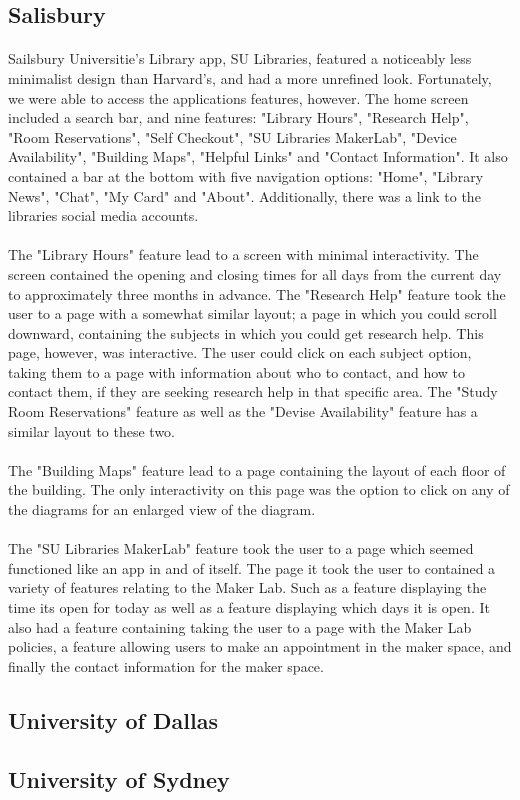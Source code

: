 \subsection{Salisbury}
\paragraph{}
Sailsbury Universitie's Library app, SU Libraries, featured a noticeably less minimalist design than Harvard's, and had a more unrefined look.  Fortunately, we were able to access the applications features, however. The home screen included a search bar, and nine features: "Library Hours", "Research Help", "Room Reservations", "Self Checkout", "SU Libraries MakerLab", "Device Availability", "Building Maps", "Helpful Links" and "Contact Information". It also contained a bar at the bottom with five navigation options: "Home", "Library News", "Chat", "My Card" and "About". Additionally, there was a link to the libraries social media accounts.
\paragraph{}
The "Library Hours" feature lead to a screen with minimal interactivity. The screen contained the opening and closing times for all days from the current day to approximately three months in advance. The "Research Help" feature took the user to a page with a somewhat similar layout; a page in which you could scroll downward, containing the subjects in which you could get research help. This page, however, was interactive. The user could click on each subject option, taking them to a page with information about who to contact, and how to contact them, if they are seeking research help in that specific area.  The "Study Room Reservations" feature as well as the "Devise Availability" feature has a similar layout to these two.
\paragraph{}
The "Building Maps" feature lead to a page containing the layout of each floor of the building. The only interactivity on this page was the option to click on any of the diagrams for an enlarged view of the diagram. 
\paragraph{}
The "SU Libraries MakerLab" feature took the user to a page which seemed functioned like an app in and of itself. The page it took the user to contained a variety of features relating to the Maker Lab. Such as a feature displaying the time its open for today as well as a feature displaying which days it is open. It also had a feature containing taking the user to a page with the Maker Lab policies, a feature allowing users to make an appointment in the maker space, and finally the contact information for the maker space. 
\paragraph{}

\subsection{University of Dallas}
\subsection{University of Sydney}